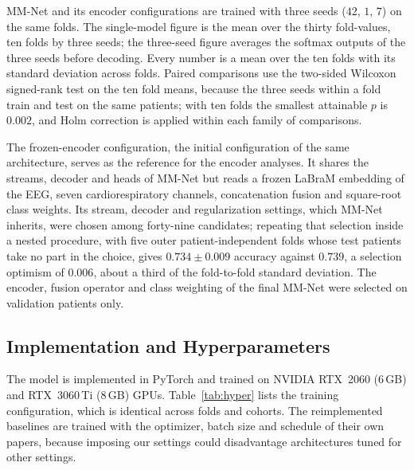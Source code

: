 \documentclass[a4paper,fleqn]{cas-sc}
\begin{document}
MM-Net and its encoder configurations are trained with three seeds ($42$, $1$, $7$) on the same
folds. The single-model figure is the mean over the thirty fold-values, ten folds by three seeds; the
three-seed figure averages the softmax outputs of the three seeds before decoding. Every number
is a mean over the ten folds with its standard deviation across folds. Paired comparisons use
the two-sided Wilcoxon signed-rank test on the ten fold means, because the three seeds within a
fold train and test on the same patients; with ten folds the smallest attainable $p$ is $0.002$,
and Holm correction is applied within each family of comparisons.

The frozen-encoder configuration, the initial configuration of the same architecture, serves as
the reference for the encoder analyses. It shares the streams, decoder and heads of MM-Net but
reads a frozen LaBraM embedding of the EEG, seven cardiorespiratory channels, concatenation
fusion and square-root class weights. Its stream, decoder and regularization settings, which MM-Net
inherits, were chosen among forty-nine candidates; repeating that selection inside a nested
procedure, with five outer patient-independent folds whose test patients take no part in the
choice, gives $0.734 \pm 0.009$ accuracy against $0.739$, a selection optimism of $0.006$, about a
third of the fold-to-fold standard deviation. The encoder, fusion operator and class weighting of
the final MM-Net were selected on validation patients only.

\subsection{Implementation and Hyperparameters}
The model is implemented in PyTorch and trained on NVIDIA RTX~2060 (6\,GB) and RTX~3060\,Ti
(8\,GB) GPUs. Table~\ref{tab:hyper} lists the training configuration, which is identical across
folds and cohorts. The reimplemented baselines are trained with the optimizer, batch size and
schedule of their own papers, because imposing our settings could disadvantage architectures
tuned for other settings.
\end{document}
